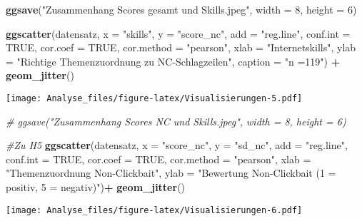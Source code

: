 \documentclass[]{article}
\newenvironment{Shaded}{\begin{snugshade}}{\end{snugshade}}
\newcommand{\KeywordTok}[1]{\textcolor[rgb]{0.13,0.29,0.53}{\textbf{#1}}}
\newcommand{\DataTypeTok}[1]{\textcolor[rgb]{0.13,0.29,0.53}{#1}}
\newcommand{\DecValTok}[1]{\textcolor[rgb]{0.00,0.00,0.81}{#1}}
\newcommand{\StringTok}[1]{\textcolor[rgb]{0.31,0.60,0.02}{#1}}
\newcommand{\CommentTok}[1]{\textcolor[rgb]{0.56,0.35,0.01}{\textit{#1}}}
\newcommand{\OtherTok}[1]{\textcolor[rgb]{0.56,0.35,0.01}{#1}}
\newcommand{\OperatorTok}[1]{\textcolor[rgb]{0.81,0.36,0.00}{\textbf{#1}}}
\newcommand{\NormalTok}[1]{#1}
\begin{document}
\begin{Shaded}
\begin{Highlighting}[]
 \KeywordTok{ggsave}\NormalTok{(}\StringTok{"Zusammenhang Scores gesamt und Skills.jpeg"}\NormalTok{, }\DataTypeTok{width =} \DecValTok{8}\NormalTok{, }\DataTypeTok{height =} \DecValTok{6}\NormalTok{)}
 
\KeywordTok{ggscatter}\NormalTok{(datensatz, }\DataTypeTok{x =} \StringTok{"skills"}\NormalTok{, }\DataTypeTok{y =} \StringTok{"score_nc"}\NormalTok{, }
          \DataTypeTok{add =} \StringTok{"reg.line"}\NormalTok{, }\DataTypeTok{conf.int =} \OtherTok{TRUE}\NormalTok{, }
          \DataTypeTok{cor.coef =} \OtherTok{TRUE}\NormalTok{, }\DataTypeTok{cor.method =} \StringTok{"pearson"}\NormalTok{,}
          \DataTypeTok{xlab =} \StringTok{"Internetskills"}\NormalTok{, }\DataTypeTok{ylab =} \StringTok{"Richtige Themenzuordnung zu NC-Schlagzeilen"}\NormalTok{, }\DataTypeTok{caption =} \StringTok{"n =119"}\NormalTok{) }\OperatorTok{+}
\StringTok{  }\KeywordTok{geom_jitter}\NormalTok{()}
\end{Highlighting}
\end{Shaded}

\texttt{[image: Analyse\_files/figure-latex/Visualisierungen-5.pdf]}

\begin{Shaded}
\begin{Highlighting}[]
\CommentTok{# ggsave("Zusammenhang Scores NC und Skills.jpeg", width = 8, height = 6)}


\CommentTok{#Zu H5}
\KeywordTok{ggscatter}\NormalTok{(datensatz, }\DataTypeTok{x =} \StringTok{"score_nc"}\NormalTok{, }\DataTypeTok{y =} \StringTok{"sd_nc"}\NormalTok{, }
          \DataTypeTok{add =} \StringTok{"reg.line"}\NormalTok{, }\DataTypeTok{conf.int =} \OtherTok{TRUE}\NormalTok{, }
          \DataTypeTok{cor.coef =} \OtherTok{TRUE}\NormalTok{, }\DataTypeTok{cor.method =} \StringTok{"pearson"}\NormalTok{,}
          \DataTypeTok{xlab =} \StringTok{"Themenzuordnung Non-Clickbait"}\NormalTok{, }\DataTypeTok{ylab =} \StringTok{"Bewertung Non-Clickbait (1 = positiv, 5 = negativ)"}\NormalTok{)}\OperatorTok{+}
\StringTok{  }\KeywordTok{geom_jitter}\NormalTok{()}
\end{Highlighting}
\end{Shaded}

\texttt{[image: Analyse\_files/figure-latex/Visualisierungen-6.pdf]}
\end{document}

